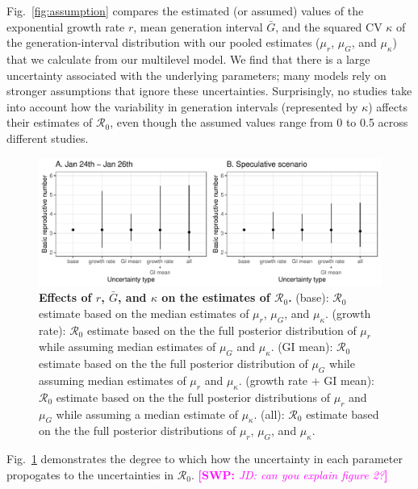 \documentclass[12pt]{article}
\newcommand{\fref}[1]{Fig.~\ref{fig:#1}}
\newcommand{\comment}[3]{\textcolor{#1}{\textbf{[#2: }\textsl{#3}\textbf{]}}}
\newcommand{\swp}[1]{\comment{magenta}{SWP}{#1}}
\begin{document}
\fref{assumption} compares the estimated (or assumed) values of the exponential growth rate $r$, mean generation interval $\bar G$, and the squared CV $\kappa$ of the generation-interval distribution with our pooled estimates ($\mu_r$, $\mu_G$, and $\mu_\kappa$) that we calculate from our multilevel model.
We find that there is a large uncertainty associated with the underlying parameters;
many models rely on stronger assumptions that ignore these uncertainties.
Surprisingly, no studies take into account how the variability in generation intervals (represented by $\kappa$) affects their estimates of $\mathcal R_0$, even though the assumed values range from 0 to 0.5 across different studies.

\begin{figure}[!ht]
\includegraphics[width=\textwidth]{figure2.pdf}
\caption{
\textbf{Effects of $r$, $\bar G$, and $\kappa$ on the estimates of $\mathcal R_0$.}
(base): $\mathcal R_0$ estimate based on the median estimates of $\mu_r$, $\mu_G$, and $\mu_\kappa$.
(growth rate): $\mathcal R_0$ estimate based on the the full posterior distribution of $\mu_r$ while assuming median estimates of $\mu_G$ and $\mu_\kappa$.
(GI mean): $\mathcal R_0$ estimate based on the the full posterior distribution of $\mu_G$ while assuming median estimates of $\mu_r$ and $\mu_\kappa$.
(growth rate + GI mean): $\mathcal R_0$ estimate based on the the full posterior distributions of $\mu_r$ and $\mu_G$ while assuming a median estimate of $\mu_\kappa$.
(all): $\mathcal R_0$ estimate based on the the full posterior distributions of  $\mu_r$, $\mu_G$, and $\mu_\kappa$.
}
\label{fig:eff}
\end{figure}

\fref{eff} demonstrates the degree to which how the uncertainty in each parameter propogates to the uncertainties in $\mathcal R_0$.
\swp{JD: can you explain figure 2?}
\end{document}
